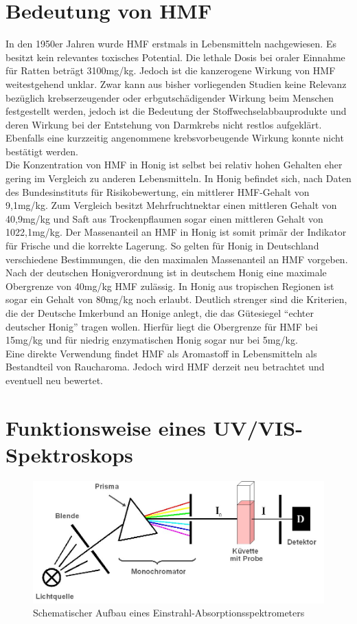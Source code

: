 \section{Bedeutung von HMF}
In den 1950er Jahren wurde HMF erstmals in Lebensmitteln nachgewiesen. Es besitzt kein relevantes toxisches Potential. Die lethale Dosis bei oraler Einnahme für Ratten beträgt 3100mg/kg. Jedoch ist die kanzerogene Wirkung von HMF weitestgehend unklar. Zwar kann aus bisher vorliegenden Studien keine Relevanz bezüglich krebserzeugender oder erbgutschädigender Wirkung beim Menschen festgestellt werden, jedoch ist die Bedeutung der Stoffwechselabbauprodukte und deren Wirkung bei der Entstehung von Darmkrebs nicht restlos aufgeklärt. Ebenfalls eine kurzzeitig angenommene krebsvorbeugende Wirkung konnte nicht bestätigt werden.
\\
Die Konzentration von HMF in Honig ist selbst bei relativ hohen Gehalten eher gering im Vergleich zu anderen Lebensmitteln. In Honig befindet sich, nach Daten des Bundesinstituts für Risikobewertung, ein mittlerer HMF-Gehalt von 9,1mg/kg. Zum Vergleich besitzt Mehrfruchtnektar einen mittleren Gehalt von 40,9mg/kg und Saft aus Trockenpflaumen sogar einen mittleren Gehalt von 1022,1mg/kg. Der Massenanteil an HMF in Honig ist somit primär der Indikator für Frische und die korrekte Lagerung. So gelten für Honig in Deutschland verschiedene Bestimmungen, die den maximalen Massenanteil an HMF vorgeben. Nach der deutschen Honigverordnung ist in deutschem Honig eine maximale Obergrenze von 40mg/kg HMF zulässig. In Honig aus tropischen Regionen ist sogar ein Gehalt von 80mg/kg noch erlaubt. Deutlich strenger sind die Kriterien, die der Deutsche Imkerbund an Honige anlegt, die das Gütesiegel ``echter deutscher Honig'' tragen wollen. Hierfür liegt die Obergrenze für HMF bei 15mg/kg und für niedrig enzymatischen Honig sogar nur bei 5mg/kg.
\\
Eine direkte Verwendung findet HMF als Aromastoff in Lebensmitteln als Bestandteil von Raucharoma. Jedoch wird HMF derzeit neu betrachtet und eventuell neu bewertet.~\cite{BfR}

\section{Funktionsweise eines UV/VIS-Spektroskops}

\begin{figure}[htbp]
	\centering
		\includegraphics[width=1.00\textwidth]{../Bilder/Einstrahlspektrometer.jpg}
	\caption{Schematischer Aufbau eines Einstrahl-Absorptionsspektrometers \cite{Schema}}
	\label{fig:Einstrahlspektrometer}
\end{figure}

